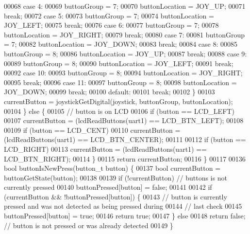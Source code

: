 \begin{DoxyCode}
00068     \textcolor{keywordflow}{case} 4:
00069       buttonGroup = 7;
00070       buttonLocation = JOY\_UP;
00071       \textcolor{keywordflow}{break};
00072     \textcolor{keywordflow}{case} 5:
00073       buttonGroup = 7;
00074       buttonLocation = JOY\_LEFT;
00075       \textcolor{keywordflow}{break};
00076     \textcolor{keywordflow}{case} 6:
00077       buttonGroup = 7;
00078       buttonLocation = JOY\_RIGHT;
00079       \textcolor{keywordflow}{break};
00080     \textcolor{keywordflow}{case} 7:
00081       buttonGroup = 7;
00082       buttonLocation = JOY\_DOWN;
00083       \textcolor{keywordflow}{break};
00084     \textcolor{keywordflow}{case} 8:
00085       buttonGroup = 8;
00086       buttonLocation = JOY\_UP;
00087       \textcolor{keywordflow}{break};
00088     \textcolor{keywordflow}{case} 9:
00089       buttonGroup = 8;
00090       buttonLocation = JOY\_LEFT;
00091       \textcolor{keywordflow}{break};
00092     \textcolor{keywordflow}{case} 10:
00093       buttonGroup = 8;
00094       buttonLocation = JOY\_RIGHT;
00095       \textcolor{keywordflow}{break};
00096     \textcolor{keywordflow}{case} 11:
00097       buttonGroup = 8;
00098       buttonLocation = JOY\_DOWN;
00099       \textcolor{keywordflow}{break};
00100     \textcolor{keywordflow}{default}:
00101       \textcolor{keywordflow}{break};
00102     \}
00103     currentButton = joystickGetDigital(joystick, buttonGroup, buttonLocation);
00104   \} \textcolor{keywordflow}{else} \{
00105     \textcolor{comment}{// button is on LCD}
00106     \textcolor{keywordflow}{if} (button == LCD_LEFT)
00107       currentButton = (lcdReadButtons(uart1) == LCD\_BTN\_LEFT);
00108 
00109     \textcolor{keywordflow}{if} (button == LCD_CENT)
00110       currentButton = (lcdReadButtons(uart1) == LCD\_BTN\_CENTER);
00111 
00112     \textcolor{keywordflow}{if} (button == LCD_RIGHT)
00113       currentButton = (lcdReadButtons(uart1) == LCD\_BTN\_RIGHT);
00114   \}
00115   \textcolor{keywordflow}{return} currentButton;
00116 \}
00117 
00136 \textcolor{keywordtype}{bool} buttonIsNewPress(button_t button) \{
00137   \textcolor{keywordtype}{bool} currentButton = buttonGetState(button);
00138 
00139   \textcolor{keywordflow}{if} (!currentButton) \textcolor{comment}{// buttons is not currently pressed}
00140     buttonPressed[button] = \textcolor{keyword}{false};
00141 
00142   \textcolor{keywordflow}{if} (currentButton && !buttonPressed[button]) \{
00143     \textcolor{comment}{// button is currently pressed and was not detected as being pressed during}
00144     \textcolor{comment}{// last check}
00145     buttonPressed[button] = \textcolor{keyword}{true};
00146     \textcolor{keywordflow}{return} \textcolor{keyword}{true};
00147   \} \textcolor{keywordflow}{else}
00148     \textcolor{keywordflow}{return} \textcolor{keyword}{false}; \textcolor{comment}{// button is not pressed or was already detected}
00149 \}
\end{DoxyCode}
